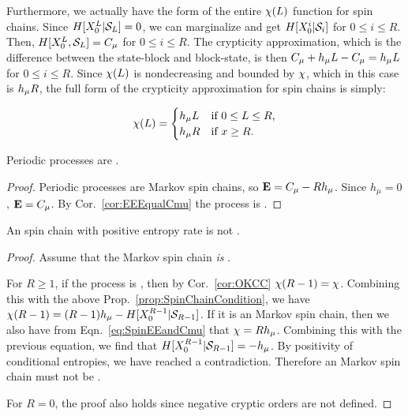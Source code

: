 Furthermore, we actually have the form of the entire $\chi(L)$ function for spin chains. Since $H[{X}_0^L | \mathcal{S}_L] = 0$, we can marginalize and get $H[{X}_0^i | \mathcal{S}_i]$ for $0 \le i \le R$. Then, $H[{X}_0^L, \mathcal{S}_L] = C_\mu$ for $0 \le i \le R$. The crypticity approximation, which is the difference between the state-block and block-state, is then $C_\mu + h_\mu L - C_\mu = h_\mu L$ for $0 \le i \le R$. Since $\chi(L)$ is nondecreasing and bounded by $\chi$, which in this case is $h_\mu R$, the full form of the crypticity approximation for spin chains is simply:

\begin{align*}
\chi(L)= 
\begin{cases} h_\mu L & \text{if $0\le L \le R$,}
\\
h_\mu R &\text{if $x \ge R$.}
\end{cases}
\end{align*}

\begin{Prop}
Periodic processes are .
\end{Prop}

\begin{proof}
Periodic processes are  Markov spin chains, so  
${\bf E} = C_\mu - R h_\mu$. Since $h_\mu = 0$, ${\bf E} = C_\mu$.
By Cor.~\ref{cor:EEEqualCmu} the process is .
\end{proof}

\begin{Prop}
An  spin chain with positive entropy rate is not
.
\label{prop:SpinChainNotRMinus1}
\end{Prop}

\begin{proof}
Assume that the  Markov spin chain \emph{is} .

For $R \ge 1$, if the process is , then by Cor.~\ref{cor:OKCC}
$\chi(R-1) = \chi$.  Combining this with the above
Prop.~\ref{prop:SpinChainCondition}, we have
$\chi(R-1) = (R-1) h_\mu - H[{X}_0^{R-1} | \mathcal{S}_{R-1}]$. If it is
an  Markov spin chain, then we also have from Eqn.~\ref{eq:SpinEEandCmu}
that $\chi = R h_\mu$. Combining this with the previous equation, we find that
$H[{X}_0^{R-1} | \mathcal{S}_{R-1}] = -h_\mu$. By positivity of
conditional entropies, we have reached a contradiction. Therefore an 
Markov spin chain must not be .

For $R=0$, the proof also holds since negative cryptic orders are not defined.
\end{proof}

